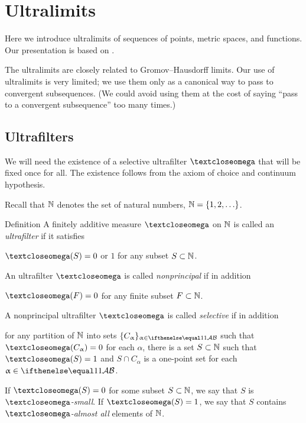 \chapter{Ultralimits}

Here we introduce ultralimits of sequences of points, metric spaces, and functions.
Our presentation is based on \cite{kleiner-leeb}.

The ultralimits are closely related to Gromov--Hausdorff limits.
Our use of ultralimits is very limited; 
we use them only as a canonical way to pass to  convergent subsequences.
(We could avoid using them at the cost of saying ``pass to a convergent subsequence'' too many times.)

\section{Ultrafilters}

We will need the existence of a selective ultrafilter $\o$ that will be fixed once for all.
The existence follows from the axiom of choice and continuum hypothesis.

Recall that $\mathbb{N}$ denotes the set of natural numbers, $\NN=\{1,2,\dots\}$.

\begin{thm}{Definition}\label{def:ultrafilter}
A finitely additive measure $\o$ 
on  $\mathbb{N}$ 
is called an \emph{ultrafilter} if it satisfies 
\begin{subthm}{}
$\o(S)=0$ or $1$ for any subset $S\subset \NN$.
\end{subthm}
An ultrafilter $\o$ is called 
\emph{nonprincipal} if in addition 
\begin{subthm}{}
$\o(F)=0$ for any finite subset $F\subset \NN$.
\end{subthm}
A nonprincipal ultrafilter $\o$ is called 
\emph{selective} if in addition 
\begin{subthm}{}
for any partition of $\mathbb{N}$ into sets $\{C_\alpha\}_{\alpha\in\IndexSet}$ such that $\o(C_\alpha)\z=0$ for each $\alpha$, 
there is a set $S\subset \NN$ such that $\o(S)=1$ and $S\cap C_\alpha$ is a one-point set for each $\alpha\in\IndexSet$.
\end{subthm}
\end{thm}

If $\o(S)=0$ for some subset $S\subset \NN$,
we say that $S$ is \emph{$\o$-small}. 
If $\o(S)=1$, we say that $S$ contains \emph{$\o$-almost all} elements of $\mathbb{N}$.

